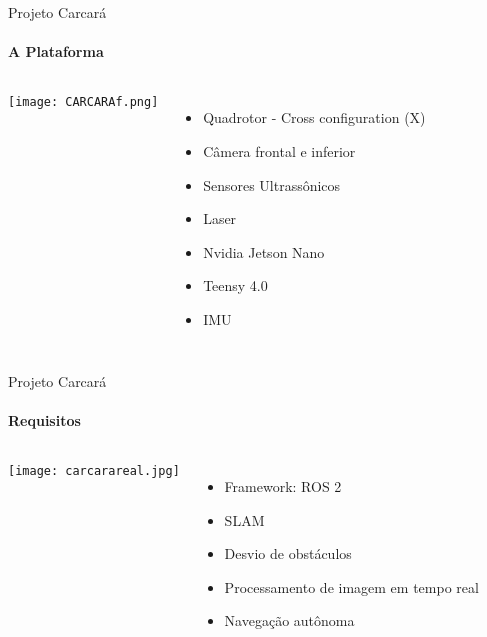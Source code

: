 \begin{frame}[t]{Projeto Carcará}
    \framesubtitle{A Plataforma}
    \transdissolve[duration=0.5]
    \begin{columns}
        \vspace*{0.4cm}
        \texttt{[image: CARCARAf.png]}
        \begin{itemize}
            \item Quadrotor - Cross configuration (X)
            \item Câmera frontal e inferior
            \item Sensores Ultrassônicos
            \item Laser
            \item Nvidia Jetson Nano
            \item Teensy 4.0
            \item IMU
        \end{itemize}
    \end{columns}
    
    
\end{frame}
\begin{frame}[t]{Projeto Carcará}
    \framesubtitle{Requisitos}
    \transdissolve[duration=0.5]
    \begin{columns}
        \vspace*{0.6cm}
        \texttt{[image: carcarareal.jpg]}
        \begin{itemize}
            \item Framework: ROS 2
            \item SLAM
            \item Desvio de obstáculos
            \item Processamento de imagem em tempo real 
            \item Navegação autônoma
        \end{itemize}
    \end{columns}
    
    
\end{frame}
